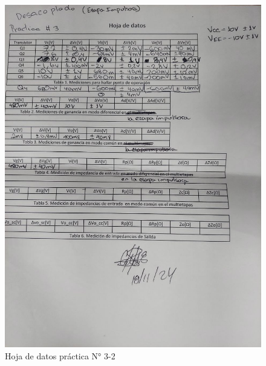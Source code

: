 \begin{figure}[ht]
    \centering
    \includegraphics[width=1.0\textwidth]{src/images/p3/p3-hoja-de-datos-2.jpg}
    \caption{Hoja de datos práctica N° 3-2}
    \label{fig:hoja-de-datos-p3-2}
\end{figure}

